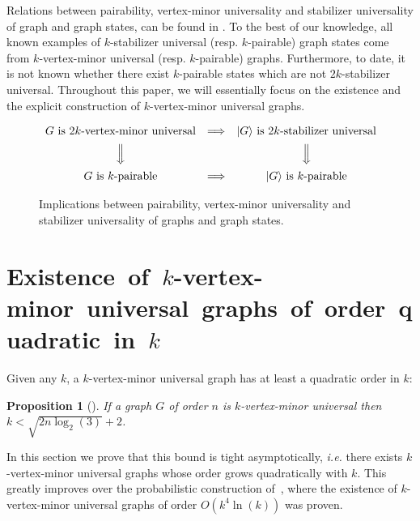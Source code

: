 \documentclass[10pt,a4paper]{article}
\newtheorem{proposition}{Proposition}[section]
\newcommand{\ket}[1]{{\ensuremath{\lvert#1\rangle}}}
\begin{document}
Relations between pairability, vertex-minor universality and stabilizer universality of graph and graph states, can be found in . To the best of our knowledge, all known examples of $k$-stabilizer universal (resp. $k$-pairable) graph states come from $k$-vertex-minor universal (resp. $k$-pairable) graphs. Furthermore, to  date, it is not known whether there exist $k$-pairable states which are not $2k$-stabilizer universal. Throughout this paper, we will essentially focus on the existence and the explicit construction of $k$-vertex-minor universal graphs.

\begin{figure}[ht]
\centering
$$
\begin{array}
[c]{ccc}
\vspace{0.5em} G \text{ is $2k$-vertex-minor universal} & \Longrightarrow & \ket G \text{ is $2k$-stabilizer universal} \\
\vspace{0.5em} \Big\Downarrow &  & \Big\Downarrow \\
G \text{ is $k$-pairable} & \Longrightarrow & \ket G \text{ is $k$-pairable} 
\end{array}
$$
\caption{Implications between pairability, vertex-minor universality and stabilizer universality of graphs and graph states.}
\label{fig:implications}
\end{figure}

\section{Existence~of~$k$-vertex-minor~universal~graphs~of~order~quadratic~in~$k$}
\label{sec:existence-mvu-quadratic-order}

Given any $k$, a $k$-vertex-minor universal graph has at least a quadratic order in $k$:%

\begin{proposition}[\!\cite{claudet2023small}]
    \!If a graph $G$ of order $n$ is $k$-vertex-minor universal then $k\!\!<\!\! \sqrt{2n\log_2(3)}\!+\!2$.
\end{proposition}

In this section we prove that this bound is tight asymptotically, \emph{i.e.} there exists $k$-vertex-minor universal graphs whose order grows quadratically with $k$. This greatly improves over the probabilistic construction of~\cite{claudet2023small}, where the existence of $k$-vertex-minor universal graphs of order $O(k^4\ln(k))$ was proven.
\end{document}
